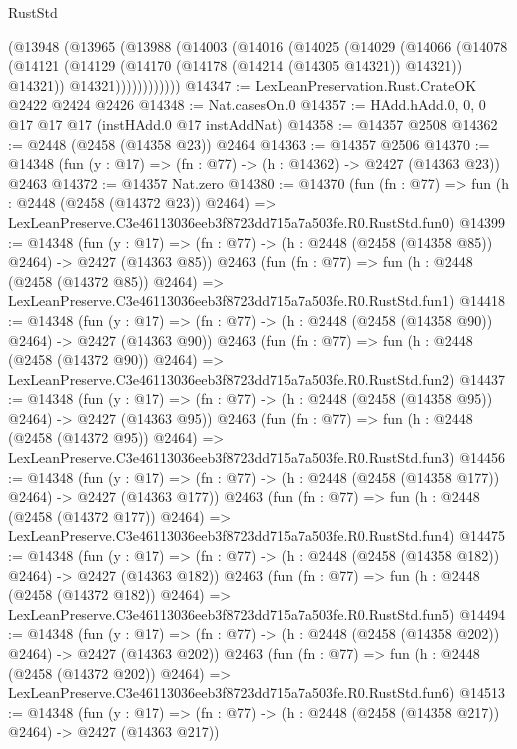 \begin{lexlean}{RustStd}
\begin{coremodule}
          (@13948
            (@13965
              (@13988
                (@14003
                  (@14016
                    (@14025
                      (@14029
                        (@14066
                          (@14078
                            (@14121
                              (@14129 (@14170 (@14178 (@14214 (@14305 @14321)) @14321)) @14321))
                            @14321))))))))))))
@14347 := LexLeanPreservation.Rust.CrateOK @2422 @2424 @2426
@14348 := Nat.casesOn.{0}
@14357 := HAdd.hAdd.{0, 0, 0} @17 @17 @17 (instHAdd.{0} @17 instAddNat)
@14358 := @14357 @2508
@14362 := @2448 (@2458 (@14358 @23)) @2464
@14363 := @14357 @2506
@14370 := @14348 (fun (y : @17) => (fn : @77) -> (h : @14362) -> @2427 (@14363 @23)) @2463
@14372 := @14357 Nat.zero
@14380 := @14370
    (fun (fn : @77) =>
    fun (h : @2448 (@2458 (@14372 @23)) @2464) =>
    LexLeanPreserve.C3e46113036eeb3f8723dd715a7a503fe.R0.RustStd.fun0)
@14399 := @14348
    (fun (y : @17) => (fn : @77) -> (h : @2448 (@2458 (@14358 @85)) @2464) -> @2427 (@14363 @85))
    @2463
    (fun (fn : @77) =>
    fun (h : @2448 (@2458 (@14372 @85)) @2464) =>
    LexLeanPreserve.C3e46113036eeb3f8723dd715a7a503fe.R0.RustStd.fun1)
@14418 := @14348
    (fun (y : @17) => (fn : @77) -> (h : @2448 (@2458 (@14358 @90)) @2464) -> @2427 (@14363 @90))
    @2463
    (fun (fn : @77) =>
    fun (h : @2448 (@2458 (@14372 @90)) @2464) =>
    LexLeanPreserve.C3e46113036eeb3f8723dd715a7a503fe.R0.RustStd.fun2)
@14437 := @14348
    (fun (y : @17) => (fn : @77) -> (h : @2448 (@2458 (@14358 @95)) @2464) -> @2427 (@14363 @95))
    @2463
    (fun (fn : @77) =>
    fun (h : @2448 (@2458 (@14372 @95)) @2464) =>
    LexLeanPreserve.C3e46113036eeb3f8723dd715a7a503fe.R0.RustStd.fun3)
@14456 := @14348
    (fun (y : @17) => (fn : @77) -> (h : @2448 (@2458 (@14358 @177)) @2464) -> @2427 (@14363 @177))
    @2463
    (fun (fn : @77) =>
    fun (h : @2448 (@2458 (@14372 @177)) @2464) =>
    LexLeanPreserve.C3e46113036eeb3f8723dd715a7a503fe.R0.RustStd.fun4)
@14475 := @14348
    (fun (y : @17) => (fn : @77) -> (h : @2448 (@2458 (@14358 @182)) @2464) -> @2427 (@14363 @182))
    @2463
    (fun (fn : @77) =>
    fun (h : @2448 (@2458 (@14372 @182)) @2464) =>
    LexLeanPreserve.C3e46113036eeb3f8723dd715a7a503fe.R0.RustStd.fun5)
@14494 := @14348
    (fun (y : @17) => (fn : @77) -> (h : @2448 (@2458 (@14358 @202)) @2464) -> @2427 (@14363 @202))
    @2463
    (fun (fn : @77) =>
    fun (h : @2448 (@2458 (@14372 @202)) @2464) =>
    LexLeanPreserve.C3e46113036eeb3f8723dd715a7a503fe.R0.RustStd.fun6)
@14513 := @14348
    (fun (y : @17) => (fn : @77) -> (h : @2448 (@2458 (@14358 @217)) @2464) -> @2427 (@14363 @217))

\end{coremodule}
\end{lexlean}
